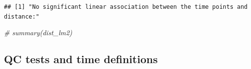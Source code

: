 \documentclass[]{article}
\newenvironment{Shaded}{\begin{snugshade}}{\end{snugshade}}
\newcommand{\StringTok}[1]{\textcolor[rgb]{0.31,0.60,0.02}{#1}}
\newcommand{\CommentTok}[1]{\textcolor[rgb]{0.56,0.35,0.01}{\textit{#1}}}
\newcommand{\OperatorTok}[1]{\textcolor[rgb]{0.81,0.36,0.00}{\textbf{#1}}}
\newcommand{\NormalTok}[1]{#1}
\begin{document}
\begin{verbatim}
## [1] "No significant linear association between the time points and distance:"
\end{verbatim}

\begin{Shaded}
\begin{Highlighting}[]
\CommentTok{# summary(dist_lm2)}
\end{Highlighting}
\end{Shaded}

\subsection{QC tests and time
definitions}\label{qc-tests-and-time-definitions}

\begin{Shaded}
\end{Shaded}
\end{document}
